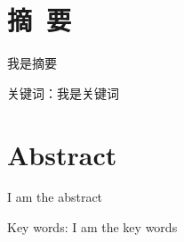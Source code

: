 
{
\section*{摘~要}

我是摘要

\noindent 关键词：我是关键词

\clearpage

\section*{Abstract}

I am the abstract

\noindent Key words: I am the key words
}
